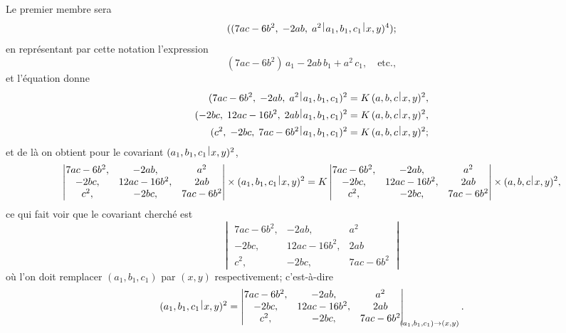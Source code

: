 \documentclass[11pt,a4paper]{book}
\theoremstyle{plain}
\newcommand{\wrule}{\hspace{-0.1em}\mid\hspace{-0.1em}}
\begin{document}
Le premier membre sera
\[
((7ac-6b^2,\;-2ab,\;a^2\,\raisebox{0.5ex}{$\wrule$}\,a_1,b_1,c_1\,\raisebox{0.5ex}{$\wrule$}\,x,y)^4);
\]
en repr\'{e}sentant par cette notation l'expression
\[
(7ac-6b^2)\,a_1-2ab\,b_1+a^2\,c_1,\quad\text{etc.},
\]
et l'\'{e}quation donne
\begin{align*}
(7ac-6b^2,\;-2ab,\;a^2\,\raisebox{0.5ex}{$\wrule$}\,a_1,b_1,c_1)^2&=K\,(a,b,c\,\raisebox{0.5ex}{$\wrule$}\,x,y)^2,\\
(-2bc,\;12ac-16b^2,\;2ab\,\raisebox{0.5ex}{$\wrule$}\,a_1,b_1,c_1)^2&=K\,(a,b,c\,\raisebox{0.5ex}{$\wrule$}\,x,y)^2,\\
(c^2,\;-2bc,\;7ac-6b^2\,\raisebox{0.5ex}{$\wrule$}\,a_1,b_1,c_1)^2&=K\,(a,b,c\,\raisebox{0.5ex}{$\wrule$}\,x,y)^2;
\end{align*}
et de l\`{a} on obtient pour le covariant $(a_1,b_1,c_1\,\raisebox{0.5ex}{$\wrule$}\,x,y)^2$,
\[
\begin{vmatrix}
7ac-6b^2, & -2ab, & a^2\\
-2bc, & 12ac-16b^2, & 2ab\\
c^2, & -2bc, & 7ac-6b^2
\end{vmatrix}
\times(a_1,b_1,c_1\,\raisebox{0.5ex}{$\wrule$}\,x,y)^2
=K\begin{vmatrix}
7ac-6b^2, & -2ab, & a^2\\
-2bc, & 12ac-16b^2, & 2ab\\
c^2, & -2bc, & 7ac-6b^2
\end{vmatrix}
\times(a,b,c\,\raisebox{0.5ex}{$\wrule$}\,x,y)^2,
\]
ce qui fait voir que le covariant cherch\'{e} est
\[
\begin{vmatrix}
7ac-6b^2, & -2ab, & a^2\\
-2bc, & 12ac-16b^2, & 2ab\\
c^2, & -2bc, & 7ac-6b^2
\end{vmatrix}
\]
o\`{u} l'on doit remplacer $(a_1,b_1,c_1)$ par $(x,y)$ respectivement; c'est-\`{a}-dire
\[
(a_1,b_1,c_1\,\raisebox{0.5ex}{$\wrule$}\,x,y)^2=\begin{vmatrix}
7ac-6b^2, & -2ab, & a^2\\
-2bc, & 12ac-16b^2, & 2ab\\
c^2, & -2bc, & 7ac-6b^2
\end{vmatrix}_{\!\!\!(a_1,b_1,c_1)\to(x,y)}.
\]
\newpage

\end{document}
